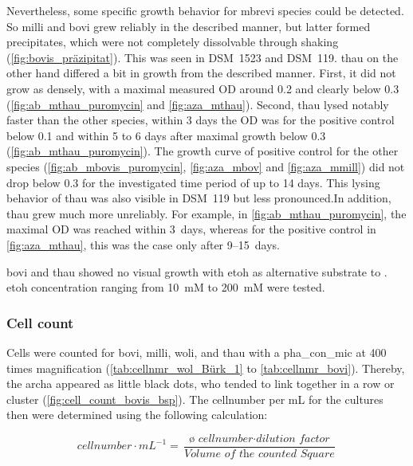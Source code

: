Nevertheless, some specific growth behavior for \acrlong{mbrevi} species could be detected. So \acrshort{milli} and \acrshort{bovi} grew reliably in the described manner, but latter formed precipitates, which were not completely dissolvable through shaking (\cref{fig:bovis_präzipitat}). This was seen in DSM~1523 and DSM~119. \acrshort{thau} on the other hand differed a bit in growth from the described manner. First, it did not grow as densely, with a maximal measured \acrshort{OD} around 0.2 and clearly below 0.3 (\cref{fig:ab_mthau_puromycin} and \ref{fig:aza_mthau}). Second, \acrshort{thau} lysed notably faster than the other species, within 3 days the \acrshort{OD} was for the positive control below 0.1 and within 5 to 6 days after maximal growth below 0.3 (\cref{fig:ab_mthau_puromycin}). The growth curve of positive control for the other species (\cref{fig:ab_mbovis_puromycin}, \ref{fig:aza_mbov} and \ref{fig:aza_mmill}) did not drop below 0.3 for the investigated time period of up to 14 days. This lysing behavior of \acrshort{thau} was also visible in DSM~119 but less pronounced.In addition, \acrshort{thau} grew much more unreliably. For example, in \cref{fig:ab_mthau_puromycin}, the maximal \acrshort{OD} was reached within 3~days, whereas for the positive control in \cref{fig:aza_mthau}, this was the case only after 9--15~days.

\acrshort{bovi} and \acrshort{thau} showed no visual growth with \acrfull{etoh} as alternative substrate to . \acrshort{etoh} concentration ranging from 10~mM to 200~mM were tested.

\subsubsection{Cell count}
Cells were counted for \acrshort{bovi}, \acrshort{milli}, \acrshort{woli}, and \acrshort{thau} with a \gls{pha_con_mic} at 400 times magnification (\cref{tab:cellnmr_wol_Bürk_1} to \cref{tab:cellnmr_bovi}). Thereby, the \gls{archa} appeared as little black dots, who tended to link together in a row or cluster (\cref{fig:cell_count_bovis_bsp}).
The cellnumber per mL for the cultures then were determined using the following calculation:

\begin{equation}
	\textit{cellnumber} \cdot mL^{-1} = \frac{\textit{ø cellnumber}\cdot \textit{dilution factor}}{\textit{Volume of the counted Square}}
	\label{eq:cellnmbr_per_ml}
\end{equation}

